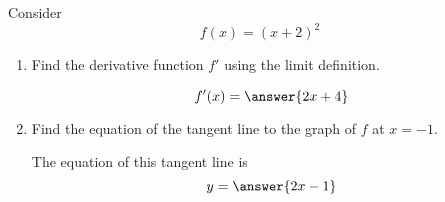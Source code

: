 \documentclass{ximera}
\author{Steven Gubkin}
\begin{document}
\begin{exercise}

Consider 
\[
f(x) = (x+2)^2
\]



\begin{enumerate}
\item Find the derivative function $f'$ using the limit definition.
\begin{prompt} 
\[
f'(x) = \answer{2x+4}
\]
\end{prompt}

\item  Find the equation of the tangent line to the graph of $f$ at $x=-1$.

\begin{prompt} 
The equation of this tangent line is
$$ y = \answer{ 2x - 1}$$ 
\end{prompt}

\end{enumerate}

\end{exercise}
\end{document}
